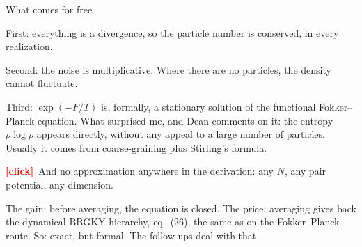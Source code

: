 \documentclass[12pt,aspectratio=169]{beamer}
\newcommand{\clk}{\textbf{\textcolor{red}{[click]}}\ }
\begin{document}
\begin{frame}[t]{What comes for free}
{First: everything is a divergence, so the particle number is conserved, in every realization.

Second: the noise is multiplicative. Where there are no particles, the density cannot fluctuate.

Third: $\exp(-F/T)$ is, formally, a stationary solution of the functional Fokker--Planck equation. What surprised me, and Dean comments on it: the entropy $\rho\log\rho$ appears directly, without any appeal to a large number of particles. Usually it comes from coarse-graining plus Stirling's formula.

\clk And no approximation anywhere in the derivation: any $N$, any pair potential, any dimension.

The gain: before averaging, the equation is closed. The price: averaging gives back the dynamical BBGKY hierarchy, eq.~(26), the same as on the Fokker--Planck route. So: exact, but formal. The follow-ups deal with that.}
\end{frame}
\end{document}
